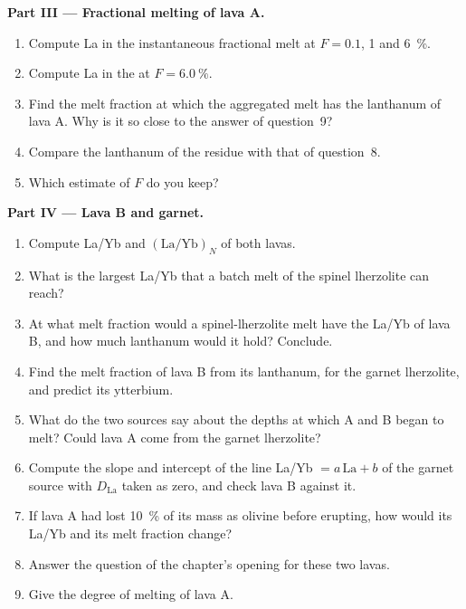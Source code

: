 \begin{problem}
\medskip\noindent\textbf{Part III --- Fractional melting of lava A.}
\begin{enumerate}[resume]
\item Compute La in the instantaneous fractional melt at $F = 0.1$, 1 and
\qty{6}{\percent}.
\item Compute La in the  at $F = \qty{6.0}{\percent}$.
\item Find the melt fraction at which the aggregated melt has the lanthanum of
lava A. Why is it so close to the answer of question~9?
\item Compare the lanthanum of the residue with that of question~8.
\item Which estimate of $F$ do you keep?
\end{enumerate}

\medskip\noindent\textbf{Part IV --- Lava B and garnet.}
\begin{enumerate}[resume]
\item Compute La/Yb and $(\mathrm{La}/\mathrm{Yb})_N$ of both lavas.
\item What is the largest La/Yb that a batch melt of the spinel lherzolite can
reach?
\item At what melt fraction would a spinel-lherzolite melt have the La/Yb of
lava B, and how much lanthanum would it hold? Conclude.
\item Find the melt fraction of lava B from its lanthanum, for the garnet
lherzolite, and predict its ytterbium.
\item What do the two sources say about the depths at which A and B began to
melt? Could lava A come from the garnet lherzolite?
\item Compute the slope and intercept of the  line La/Yb $= a\,
\mathrm{La} + b$ of the garnet source with $D_{\mathrm{La}}$ taken as zero,
and check lava B against it.
\item If lava A had lost \qty{10}{\percent} of its mass as olivine before
erupting, how would its La/Yb and its melt fraction change?
\item Answer the question of the chapter's opening for these two lavas.
\item Give the degree of melting of lava A.
\end{enumerate}
\end{problem}
